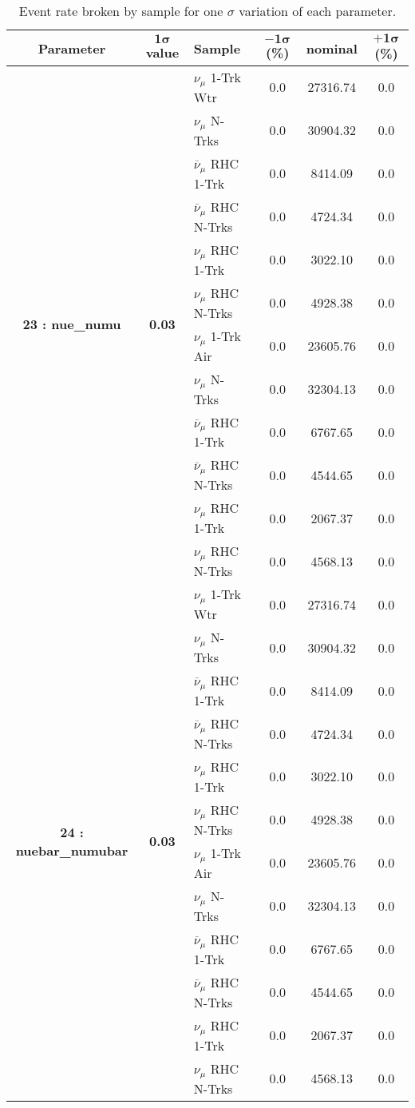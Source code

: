 \addtocounter{table}{-1}
\begin{table}[ht!]
\centering
\begin{tabular}{ c  c  l  c  c  c }
\midrule[1.3pt]
\textbf{Parameter} & \textbf{$\mathbf{1\sigma}$ value} & \textbf{Sample} & \textbf{$\mathbf{-1\sigma}$ (\%)}  &  \textbf{nominal}  &  \textbf{$\mathbf{+1\sigma}$ (\%)} \\
\midrule[1.3pt]
\multirow{12}{*}{\textbf{23 : nue\_numu}} & \multirow{12}{*}{\textbf{0.03}} & $\nu_\mu$ 1-Trk Wtr &   0.0 &  27316.74 &   0.0 \\ 
 &  & $\nu_\mu$ N-Trks &   0.0 &  30904.32 &   0.0 \\ 
 &  & $\overline{\nu}_\mu$ RHC 1-Trk &   0.0 &  8414.09 &   0.0 \\ 
 &  & $\overline{\nu}_\mu$ RHC N-Trks &   0.0 &  4724.34 &   0.0 \\ 
 &  & $\nu_\mu$ RHC 1-Trk &   0.0 &  3022.10 &   0.0 \\ 
 &  & $\nu_\mu$ RHC N-Trks &   0.0 &  4928.38 &   0.0 \\ 
 &  & $\nu_\mu$ 1-Trk Air &   0.0 &  23605.76 &   0.0 \\ 
 &  & $\nu_\mu$ N-Trks &   0.0 &  32304.13 &   0.0 \\ 
 &  & $\overline{\nu}_\mu$ RHC 1-Trk &   0.0 &  6767.65 &   0.0 \\ 
 &  & $\overline{\nu}_\mu$ RHC N-Trks &   0.0 &  4544.65 &   0.0 \\ 
 &  & $\nu_\mu$ RHC 1-Trk &   0.0 &  2067.37 &   0.0 \\ 
 &  & $\nu_\mu$ RHC N-Trks &   0.0 &  4568.13 &   0.0 \\ 
\midrule[1.3pt]
\multirow{12}{*}{\textbf{24 : nuebar\_numubar}} & \multirow{12}{*}{\textbf{0.03}} & $\nu_\mu$ 1-Trk Wtr &   0.0 &  27316.74 &   0.0 \\ 
 &  & $\nu_\mu$ N-Trks &   0.0 &  30904.32 &   0.0 \\ 
 &  & $\overline{\nu}_\mu$ RHC 1-Trk &   0.0 &  8414.09 &   0.0 \\ 
 &  & $\overline{\nu}_\mu$ RHC N-Trks &   0.0 &  4724.34 &   0.0 \\ 
 &  & $\nu_\mu$ RHC 1-Trk &   0.0 &  3022.10 &   0.0 \\ 
 &  & $\nu_\mu$ RHC N-Trks &   0.0 &  4928.38 &   0.0 \\ 
 &  & $\nu_\mu$ 1-Trk Air &   0.0 &  23605.76 &   0.0 \\ 
 &  & $\nu_\mu$ N-Trks &   0.0 &  32304.13 &   0.0 \\ 
 &  & $\overline{\nu}_\mu$ RHC 1-Trk &   0.0 &  6767.65 &   0.0 \\ 
 &  & $\overline{\nu}_\mu$ RHC N-Trks &   0.0 &  4544.65 &   0.0 \\ 
 &  & $\nu_\mu$ RHC 1-Trk &   0.0 &  2067.37 &   0.0 \\ 
 &  & $\nu_\mu$ RHC N-Trks &   0.0 &  4568.13 &   0.0 \\ 
\midrule[1.3pt]
\end{tabular}
\centering
\caption{Event rate broken by sample for one $\sigma$ variation of each parameter.}
\end{table}
